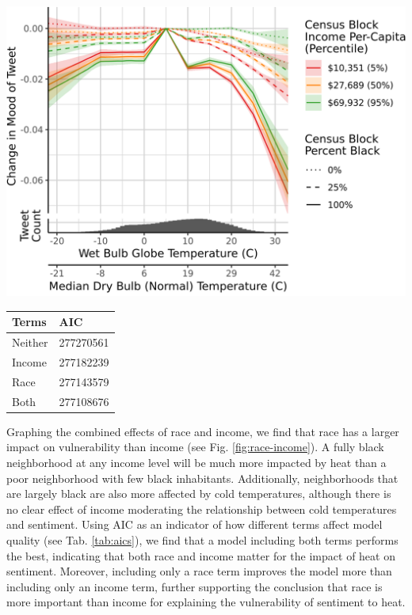 \documentclass[fleqn,10pt]{wlscirep}
\begin{document}
\begin{minipage}{.65\textwidth}
\centering
\includegraphics[width=\textwidth]{../res/wbgt-income-race.png}
\label{fig:race-income}
\end{minipage}\hfill
\begin{minipage}{.35\textwidth}
\centering
\begin{tabular}{| l | l |}
\hline
Terms & AIC \\
\hline
Neither & 277270561 \\
Income  & 277182239 \\
Race    & 277143579 \\
Both    & 277108676 \\
\hline
\end{tabular}
\label{tab:aics}
\end{minipage}

Graphing the combined effects of race and income, we find that race has a larger impact on vulnerability than income (see Fig. \ref{fig:race-income}).  A fully black neighborhood at any income level will be much more impacted by heat than a poor neighborhood with few black inhabitants.  Additionally, neighborhoods that are largely black are also more affected by cold temperatures, although there is no clear effect of income moderating the relationship between cold temperatures and sentiment.  Using AIC as an indicator of how different terms affect model quality (see Tab. \ref{tab:aics}), we find that a model including both terms performs the best, indicating that both race and income matter for the impact of heat on sentiment.  Moreover, including only a race term improves the model more than including only an income term, further supporting the conclusion that race is more important than income for explaining the vulnerability of sentiment to heat.
\end{document}
